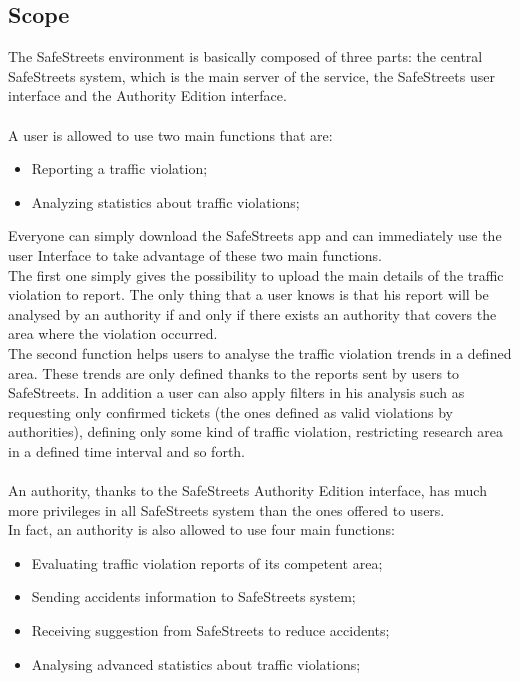 \documentclass{article}
\begin{document}
		\subsection{Scope}
			The SafeStreets environment is basically composed of three parts: the central SafeStreets system, which is the main server of the service, the SafeStreets user interface and the Authority Edition interface. \\\\
			A user is allowed to use two main functions that are:
			\begin{itemize}
				\item Reporting a traffic violation;
				\item Analyzing statistics about traffic violations;
			\end{itemize}
			Everyone can simply download the SafeStreets app and can immediately use the user Interface to take advantage of these two main functions.\\
	    	The first one simply gives the possibility to upload the main details of the traffic violation to report. The only thing that a user knows is that his report will be analysed by an authority if and only if there exists an authority that covers the area where the violation occurred.\\
	    	The second function helps users to analyse the traffic violation trends in a defined area. These trends are only defined thanks to the reports sent by users to SafeStreets. In addition a user can also apply filters in his analysis such as requesting only confirmed tickets (the ones defined as valid violations by authorities), defining only some kind of traffic violation, restricting research area in a defined time interval and so forth.\\\\
	    	An authority, thanks to the SafeStreets Authority Edition interface, has much more privileges in all SafeStreets system than the ones offered to users.\\
	    	In fact, an authority is also allowed to use four main functions:
	    	\begin{itemize}
	    		\item Evaluating traffic violation reports of its competent area;
	    		\item Sending accidents information to SafeStreets system;
	    		\item Receiving suggestion from SafeStreets to reduce accidents;
	    		\item Analysing advanced statistics about traffic violations;
	    	\end{itemize}
\end{document}
